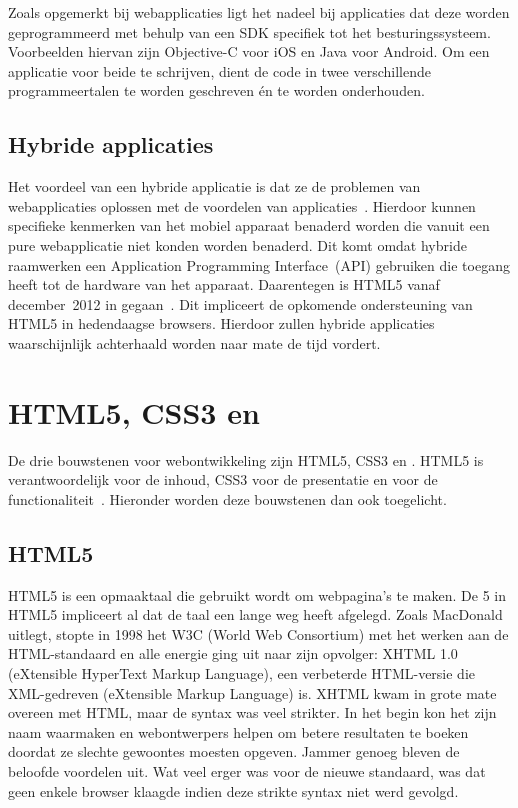 Zoals opgemerkt bij webapplicaties ligt het nadeel bij  applicaties dat deze worden geprogrammeerd met behulp van een SDK specifiek tot het besturingssysteem.
Voorbeelden hiervan zijn Objective-C voor iOS en Java voor Android.
Om een applicatie voor beide te schrijven, dient de code in twee verschillende programmeertalen te worden geschreven én te worden onderhouden.

\subsection{Hybride applicaties}
\label{sec:literatuur-hydribe}
Het voordeel van een hybride applicatie is dat ze de problemen van webapplicaties oplossen met de voordelen van  applicaties~\cite{Mobile2012}.
Hierdoor kunnen specifieke kenmerken van het mobiel apparaat benaderd worden die vanuit een pure webapplicatie niet konden worden benaderd.
Dit komt omdat hybride raamwerken een Application Programming Interface~(API) gebruiken die toegang heeft tot de hardware van het apparaat.
Daarentegen is HTML5 vanaf december~2012 in  gegaan~\cite{Jacobs2012}.
Dit impliceert de opkomende ondersteuning van HTML5 in hedendaagse browsers.
Hierdoor zullen hybride applicaties waarschijnlijk achterhaald worden naar mate de tijd vordert.


\section{HTML5, CSS3 en \js}
\label{sec:html5-css3-js}
De drie bouwstenen voor webontwikkeling zijn HTML5, CSS3 en \js{}. 
HTML5 is verantwoordelijk voor de inhoud, CSS3 voor de presentatie en \js{} voor de functionaliteit~\cite{PhilDutson2012}. 
Hieronder worden deze bouwstenen dan ook toegelicht.

\subsection{HTML5}
\label{sec:html5}
HTML5 is een opmaaktaal die gebruikt wordt om webpagina's te maken.
De 5 in HTML5 impliceert al dat de taal een lange weg heeft afgelegd.
Zoals MacDonald~\cite{MacDonald2011} uitlegt, stopte in 1998 het W3C (World Web Consortium) met het werken aan de HTML-standaard en alle energie ging uit naar zijn opvolger: XHTML 1.0 (eXtensible HyperText Markup Language), een verbeterde HTML-versie die XML-gedreven (eXtensible Markup Language) is. 
XHTML kwam in grote mate overeen met HTML, maar de syntax was veel strikter. 
In het begin kon het zijn naam waarmaken en webontwerpers helpen om betere resultaten te boeken doordat ze slechte gewoontes moesten opgeven. 
Jammer genoeg bleven de beloofde voordelen uit. 
Wat veel erger was voor de nieuwe standaard, was dat geen enkele browser klaagde indien deze strikte syntax niet werd gevolgd.

